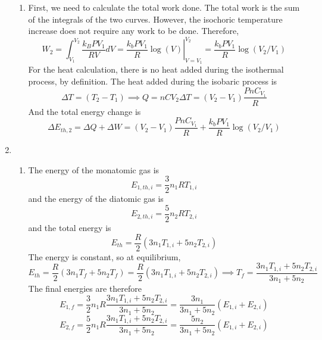 \documentclass[fleqn]{article}[12pt]
\begin{document}
\begin{enumerate}
\begin{enumerate}
        \item First, we need to calculate the total work done. The total work is the sum of the integrals of the two curves. However, the isochoric temperature increase does not require any work to be done. Therefore,
        \begin{equation*}
            W_2 = \int_{V_1}^{V_2} \frac{k_B PV_1} {R V} dV = \left. \frac{k_b P V_1}{R} \log(V)\right|_{V=V_1}^{V_2} =
            \frac{k_b P V_1}{R} \log(V_2/V_1)
        \end{equation*}
        For the heat calculation, there is no heat added during the isothermal process, by definition. The heat added during the isobaric process is
        \begin{equation*}
            \Delta T = (T_2 - T_1) \implies Q = nCV_2 \Delta T = (V_2-V_1) \frac{PnC_{V_1}}{R}
        \end{equation*}
        And the total energy change is
        \begin{equation*}
            \Delta E_{th,2} = \Delta Q + \Delta W = (V_2-V_1) \frac{PnC_{V_1}}{R}  + \frac{k_b P V_1}{R} \log(V_2/V_1)
        \end{equation*}
    \end{enumerate}

    \item \begin{enumerate}
        \item The energy of the monatomic gas is
        \begin{equation*}
            E_{1,th,i} = \frac{3}{2}n_1RT_{1,i}
        \end{equation*}
        and the energy of the diatomic gas is
        \begin{equation*}
            E_{2,th,i} = \frac{5}{2}n_2RT_{2,i}
        \end{equation*}
        and the total energy is
        \begin{equation*}
            E_{th} = \frac{R}{2}(3n_1T_{1,i} + 5n_2T_{2,i})
        \end{equation*}
        The energy is constant, so at equilibrium,
        \begin{equation*}
            E_{th} = \frac{R}{2}(3n_1T_f + 5n_2T_f) = \frac{R}{2}(3n_1T_{1,i} + 5n_2T_{2,i}) \implies T_f =
            \frac{3 n_1 T_{1,i} + 5 n_2 T_{2,i}}{3n_1 + 5n_2}
        \end{equation*}
        The final energies are therefore
        \begin{equation*}
            E_{1,f} = \frac{3}{2} n_1 R \frac{3 n_1 T_{1,i} + 5 n_2 T_{2,i}}{3n_1 + 5n_2} = \frac{3 n_1}{3n_1 + 5n_2} (E_{1,i} + E_{2,i})
        \end{equation*}
        \begin{equation*}
            E_{2,f} = \frac{5}{2} n_1 R \frac{3 n_1 T_{1,i} + 5 n_2 T_{2,i}}{3n_1 + 5n_2} = \frac{5 n_2}{3n_1 + 5n_2} (E_{1,i} + E_{2,i})
        \end{equation*}


\end{enumerate}
\end{enumerate}
\end{document}

